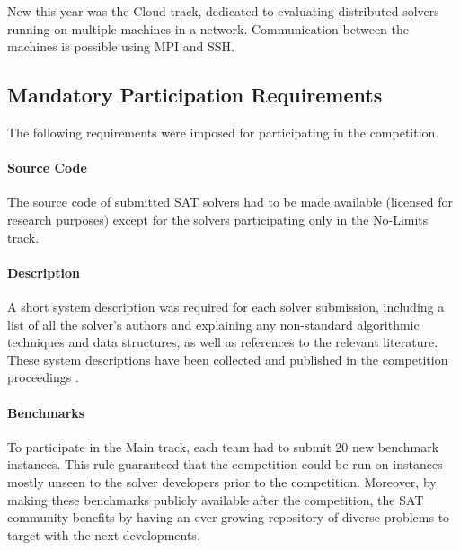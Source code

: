 \documentclass{elsarticle}
\begin{document}
New this year was the Cloud track, dedicated to evaluating distributed solvers running on multiple machines in a network. 
Communication between the machines is possible using MPI and SSH.

\subsection{Mandatory Participation Requirements}
\label{sec:rules}

The following requirements were imposed for 
participating in the competition.

\paragraph{Source Code}
The source code of submitted SAT solvers had to be made available 
(licensed for research purposes) except for the solvers participating only in the No-Limits track.

\paragraph{Description}
A short system description was required for each solver submission,
including a list of all the solver's authors and explaining any non-standard algorithmic
techniques and data structures, as well as references to the relevant literature.
These system descriptions have been collected and published in the competition
proceedings \cite{SC2020}.

\paragraph{Benchmarks}
To participate in the Main track, each team had to submit 20 new benchmark instances.
This rule guaranteed that the competition could be run on instances mostly unseen to the solver
developers prior to the competition. Moreover, by making these benchmarks publicly available
after the competition, the SAT community benefits by having an ever growing repository 
of diverse problems to target with the next developments.
\end{document}

